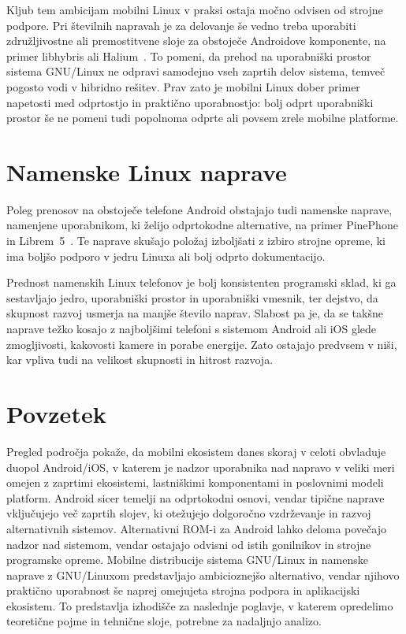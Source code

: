 \documentclass[a4paper,12pt,openright]{book}
\begin{document}
Kljub tem ambicijam mobilni Linux v praksi ostaja močno odvisen od strojne podpore.
Pri številnih napravah je za delovanje še vedno treba uporabiti združljivostne ali premostitvene sloje za obstoječe Androidove komponente, na primer libhybris ali Halium~\cite{halium_docs_intro,libhybris_readme,sailfish_hadk_libhybris}.
To pomeni, da prehod na uporabniški prostor sistema GNU/Linux ne odpravi samodejno vseh zaprtih delov sistema, temveč pogosto vodi v hibridno rešitev.
Prav zato je mobilni Linux dober primer napetosti med odprtostjo in praktično uporabnostjo: bolj odprt uporabniški prostor še ne pomeni tudi popolnoma odprte ali povsem zrele mobilne platforme.

\section{Namenske Linux naprave}
\label{sec:linux_phones}

Poleg prenosov na obstoječe telefone Android obstajajo tudi namenske naprave, namenjene uporabnikom, ki želijo odprtokodne alternative, na primer PinePhone in Librem~5~\cite{pine64_pinephone_device,pine64_wiki_pinephone,purism_librem5_product,purism_librem5_docs}.
Te naprave skušajo položaj izboljšati z izbiro strojne opreme, ki ima boljšo podporo v jedru Linuxa ali bolj odprto dokumentacijo.

Prednost namenskih Linux telefonov je bolj konsistenten programski sklad, ki ga sestavljajo jedro, uporabniški prostor in uporabniški vmesnik, ter dejstvo, da skupnost razvoj usmerja na manjše število naprav.
Slabost pa je, da se takšne naprave težko kosajo z najboljšimi telefoni s sistemom Android ali iOS glede zmogljivosti, kakovosti kamere in porabe energije.
Zato ostajajo predvsem v niši, kar vpliva tudi na velikost skupnosti in hitrost razvoja.

\section{Povzetek}
\label{sec:povzetek_pregleda}

Pregled področja pokaže, da mobilni ekosistem danes skoraj v celoti obvladuje duopol Android/iOS, v katerem je nadzor uporabnika nad napravo v veliki meri omejen z zaprtimi ekosistemi, lastniškimi komponentami in poslovnimi modeli platform.
Android sicer temelji na odprtokodni osnovi, vendar tipične naprave vključujejo več zaprtih slojev, ki otežujejo dolgoročno vzdrževanje in razvoj alternativnih sistemov.
Alternativni ROM-i za Android lahko deloma povečajo nadzor nad sistemom, vendar ostajajo odvisni od istih gonilnikov in strojne programske opreme.
Mobilne distribucije sistema GNU/Linux in namenske naprave z GNU/Linuxom predstavljajo ambicioznejšo alternativo, vendar njihovo praktično uporabnost še naprej omejujeta strojna podpora in aplikacijski ekosistem.
To predstavlja izhodišče za naslednje poglavje, v katerem opredelimo teoretične pojme in tehnične sloje, potrebne za nadaljnjo analizo.
\end{document}

